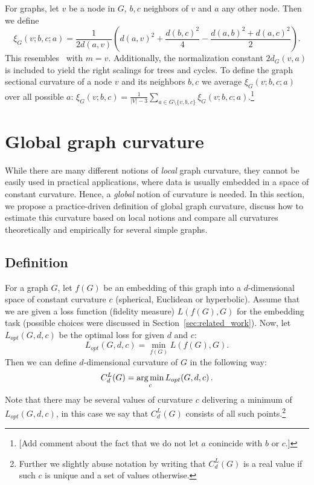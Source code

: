\documentclass{article} %
\begin{document}
For graphs, let $v$ be a node in $G$, $b,c$ neighbors of $v$ and $a$ any other node. Then we define
\begin{equation}
\xi_G(v;b,c;a) = \frac{1}{2 d(a,v)} \left( 	d(a,v)^2 + \frac{d(b,c)^2}{4} - \frac{d(a,b)^2 + d(a,c)^2}{2} \right).
\end{equation}
This resembles~ with $m = v$. Additionally, the normalization constant $2d_G(v,a)$ is included to yield the right scalings for trees and cycles.
To define the graph sectional curvature of a node $v$ and its neighbors $b,c$ we average $\xi_G(v;b,c;a)$ over all possible $a$: 
$\xi_G(v; b,c) = \frac{1}{|V|-3} \sum_{a \in G\setminus \{v,b,c\}} \xi_G(v;b,c;a)$.\footnote{[Add comment about the fact that we do not let $a$ conincide with $b$ or $c$.]}


\section{Global graph curvature}

While there are many different notions of \textit{local} graph curvature, they cannot be easily used in practical applications, where data is usually embedded in a space of constant curvature. 
Hence, a \textit{global} notion of curvature is needed. 
In this section, we propose a practice-driven definition of global graph curvature, discuss how to estimate this curvature based on local notions and compare all curvatures theoretically and empirically for several simple graphs.

\subsection{Definition}\label{sec:global_curvature_definition}

For a graph $G$, let $f(G)$ be an embedding of this graph into a $d$-dimensional space of constant curvature $c$ (spherical, Euclidean or hyperbolic). 
Assume that we are given a loss function (fidelity measure) $L(f(G),G)$ for the embedding task (possible choices were discussed in Section~\ref{sec:related_work}).
Now, let $L_{opt}(G,d,c)$ be the optimal loss for given $d$ and $c$:
\[
L_{opt}(G,d,c) = \min_{f(G)} L(f(G),G).
\]
Then we can define $d$-dimensional curvature of $G$ in the following way:
\begin{equation}\label{eq:global_curvature}
C_{d}^{L}(G) = \operatorname*{arg\,min}_c L_{opt}(G,d,c)\,.
\end{equation}
Note that there may be several values of curvature $c$ delivering a minimum of $L_{opt}(G,d,c)$, in this case we say that  $C_{d}^{L}(G)$ consists of all such points.\footnote{Further we slightly abuse notation by writing that $C_{d}^{L}(G)$ is a real value if such $c$ is unique and a set of values otherwise.}
\end{document}

